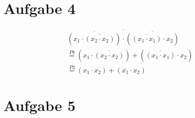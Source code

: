 \documentclass[a4paper]{article}
\begin{document}
\section*{Aufgabe 4}
\begin{equation}
\begin{aligned}
    \overline{\overline{(x_1 \cdot \overline{(x_2 \cdot x_2)})} \cdot \overline{(\overline{(x_1 \cdot x_1)} \cdot x_2)}} \\
    \stackrel{P8}{=} (x_1 \cdot \overline{(x_2 \cdot x_2)}) + (\overline{(x_1 \cdot x_1)} \cdot x_2) \\
    \stackrel{P3}{=} (x_1 \cdot \overline{x_2}) + (\overline{x_1} \cdot x_2)
\end{aligned}
\end{equation}

\section*{Aufgabe 5}
\clearpage
\end{document}

